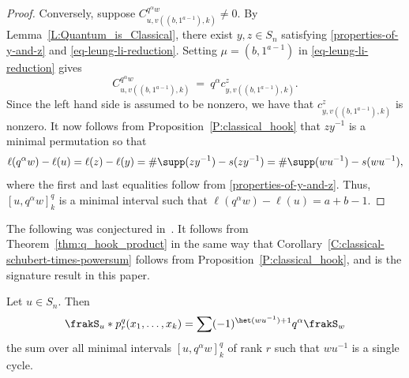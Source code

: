 \begin{proof}
    Conversely,
    suppose $C^{q^\alpha w}_{u,v((b, 1^{a-1}), k)} \neq 0$.
    By Lemma~\ref{L:Quantum_is_Classical},
    there exist $y, z \in S_n$ satisfying
    \eqref{properties-of-y-and-z} and \eqref{eq-leung-li-reduction}.
    Setting $\mu = (b, 1^{a-1})$ in \eqref{eq-leung-li-reduction} gives
    \begin{equation}
        C^{q^\alpha w}_{u,v((b, 1^{a-1}),k)}
        \ =\ q^\alpha c^z_{y,v((b, 1^{a-1}),k)}.
    \end{equation}
    Since the left hand side is assumed to be nonzero, we have that
    $c^z_{y,v((b, 1^{a-1}),k)}$ is nonzero.
    It now follows from Proposition~\ref{P:classical_hook} that
    $z y^{-1}$ is a minimal permutation so that
    \begin{equation*}
        \ell(q^\alpha w) - \ell(u)
        = \ell(z) - \ell(y)
        = \#\supp(z y^{-1}) - s(z y^{-1})
        = \#\supp(w u^{-1}) - s(w u^{-1}),
    \end{equation*}
    where the first and last equalities follow from \eqref{properties-of-y-and-z}.
    Thus, $[u, q^\alpha w]_k^q$ is a minimal interval such that
    $\ell(q^\alpha w) - \ell(u) = a{+}b{-}1$.
\end{proof}

The following was conjectured in~\cite{Morrison}.
It follows from Theorem~\ref{thm:q_hook_product} in the same way that
Corollary~\ref{C:classical-schubert-times-powersum} follows from Proposition~\ref{P:classical_hook},
and is the signature result in this paper.

\begin{corollary}
    \label{C:quantumMN}
    Let $u \in S_n$. Then
    \begin{equation*}
        \frakS_u \ast p_r^q(x_1,\dotsc,x_k) = \sum (-1)^{\het(wu^{-1})+1} q^\alpha \frakS_{w}
    \end{equation*}
    the sum over all minimal intervals $[u, q^{\alpha}w]_k^q$ of rank $r$ such that $wu^{-1}$ is a
    single cycle.
\end{corollary}

